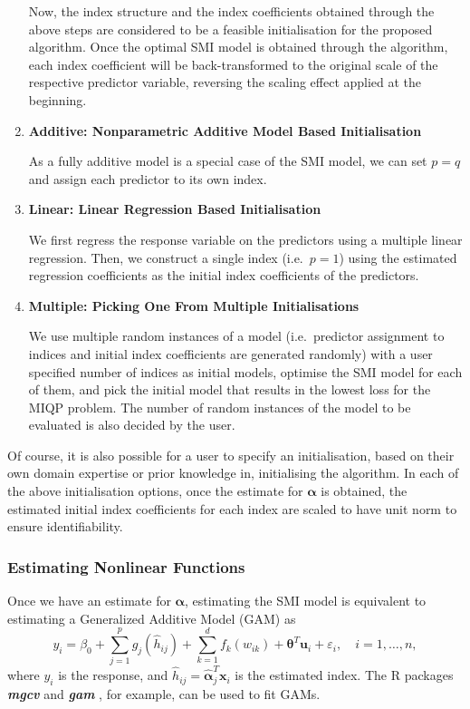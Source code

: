 \documentclass[
  11pt,
  a4paper,
]{article}
\begin{document}
\begin{enumerate}
  Now, the index structure and the index coefficients obtained through
  the above steps are considered to be a feasible initialisation for the
  proposed algorithm. Once the optimal SMI model is obtained through the
  algorithm, each index coefficient will be back-transformed to the
  original scale of the respective predictor variable, reversing the
  scaling effect applied at the beginning.
\item
  \textbf{Additive: Nonparametric Additive Model Based Initialisation}

  As a fully additive model is a special case of the SMI model, we can
  set \(p=q\) and assign each predictor to its own index.
\item
  \textbf{Linear: Linear Regression Based Initialisation}

  We first regress the response variable on the predictors using a
  multiple linear regression. Then, we construct a single index
  (i.e.~\(p = 1\)) using the estimated regression coefficients as the
  initial index coefficients of the predictors.
\item
  \textbf{Multiple: Picking One From Multiple Initialisations}

  We use multiple random instances of a model (i.e.~predictor assignment
  to indices and initial index coefficients are generated randomly) with
  a user specified number of indices as initial models, optimise the SMI
  model for each of them, and pick the initial model that results in the
  lowest loss for the MIQP problem. The number of random instances of
  the model to be evaluated is also decided by the user.
\end{enumerate}

Of course, it is also possible for a user to specify an initialisation,
based on their own domain expertise or prior knowledge in, initialising
the algorithm. In each of the above initialisation options, once the
estimate for \(\bm{\alpha}\) is obtained, the estimated initial index
coefficients for each index are scaled to have unit norm to ensure
identifiability.

\subsubsection{Estimating Nonlinear Functions}\label{sec-step2}

Once we have an estimate for \(\bm{\alpha}\), estimating the SMI model
is equivalent to estimating a Generalized Additive Model (GAM) as \[
  y_{i} = \beta_{0} + \sum_{j = 1}^{p}g_{j}(\hat{h}_{ij}) + \sum_{k = 1}^{d}f_{k}(w_{ik}) + \bm{\theta}^{T}\bm{u}_{i} + \varepsilon_{i}, \quad i = 1, \dots, n,
\] where \(y_{i}\) is the response, and
\(\hat{h}_{ij} = \hat{\bm{\alpha}}_{j}^{T}\bm{x}_{i}\) is the estimated
index. The R packages \textbf{\emph{mgcv}} \autocite{Wood2011} and
\textbf{\emph{gam}} \autocite{Hastie2023}, for example, can be used to
fit GAMs.
\end{document}
